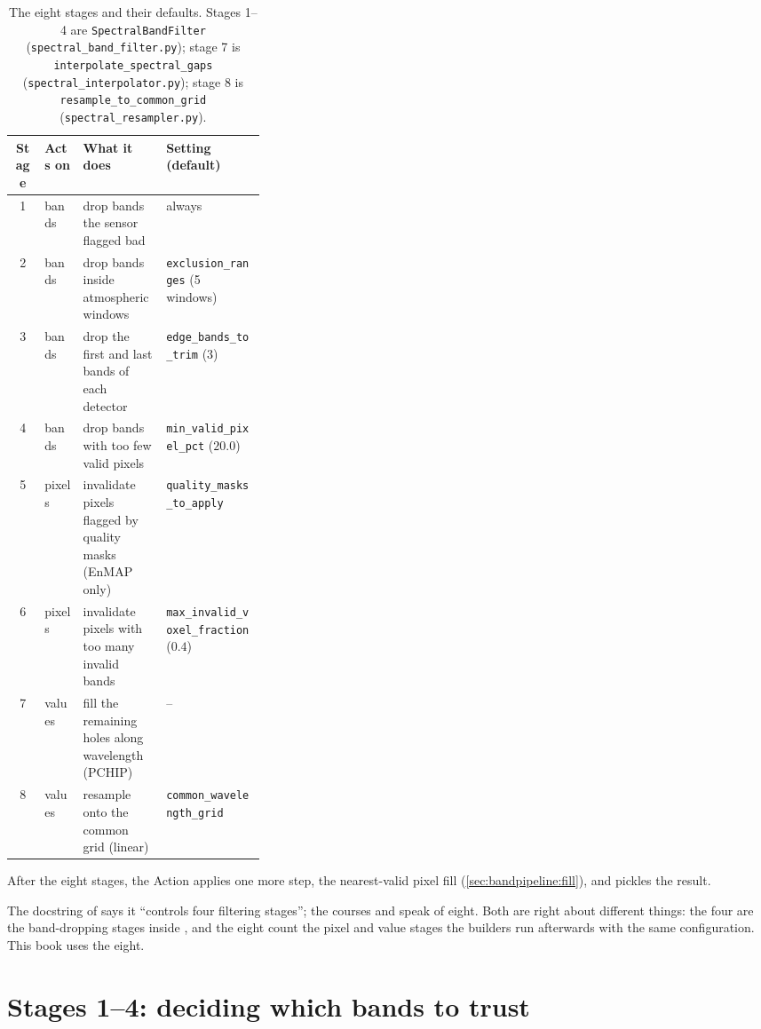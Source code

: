 \begin{table}[htbp]\centering
\caption{The eight stages and their defaults. Stages 1--4 are \texttt{SpectralBandFilter}
(\texttt{spectral\_band\_filter.py}); stage 7 is \texttt{interpolate\_spectral\_gaps}
(\texttt{spectral\_interpolator.py}); stage 8 is \texttt{resample\_to\_common\_grid}
(\texttt{spectral\_resampler.py}).}\label{tab:bandpipeline:stages}
\small
\begin{tabular}{@{}clp{0.33\linewidth}l@{}}\toprule
Stage & Acts on & What it does & Setting (default)\\\midrule
1 & bands & drop bands the sensor flagged bad & always\\
2 & bands & drop bands inside atmospheric windows & \texttt{exclusion\_ranges} (5 windows)\\
3 & bands & drop the first and last bands of each detector & \texttt{edge\_bands\_to\_trim} ($3$)\\
4 & bands & drop bands with too few valid pixels & \texttt{min\_valid\_pixel\_pct} ($20.0$)\\
5 & pixels & invalidate pixels flagged by quality masks (EnMAP only) & \texttt{quality\_masks\_to\_apply}\\
6 & pixels & invalidate pixels with too many invalid bands & \texttt{max\_invalid\_voxel\_fraction} ($0.4$)\\
7 & values & fill the remaining holes along wavelength (PCHIP) & --\\
8 & values & resample onto the common grid (linear) & \texttt{common\_wavelength\_grid}\\\bottomrule
\end{tabular}
\end{table}

After the eight stages, the  Action applies one more step, the nearest-valid
pixel fill (\cref{sec:bandpipeline:fill}), and pickles the result.

\begin{sourcenote}
The docstring of  says it ``controls four filtering stages''; the courses and
 speak of eight. Both are right about different things: the four are
the band-dropping stages inside , and the eight count the pixel and value
stages the builders run afterwards with the same configuration. This book uses the eight.
\end{sourcenote}

\section{Stages 1--4: deciding which bands to trust}\label{sec:bandpipeline:bands}

